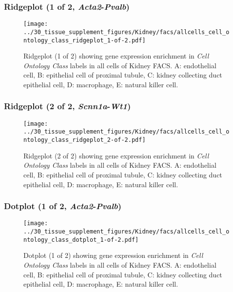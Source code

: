 \subsubsection{Ridgeplot (1 of 2, \emph{Acta2}-\emph{Pvalb})}
\begin{figure}[h]
\centering
\texttt{[image: ../30\_tissue\_supplement\_figures/Kidney/facs/allcells\_cell\_ontology\_class\_ridgeplot\_1-of-2.pdf]}

\caption{ Ridgeplot (1 of 2)  showing gene expression enrichment in \emph{Cell Ontology Class} labels in all cells of Kidney FACS. A: endothelial cell, B: epithelial cell of proximal tubule, C: kidney collecting duct epithelial cell, D: macrophage, E: natural killer cell.}
\end{figure}


\clearpage

\subsubsection{Ridgeplot (2 of 2, \emph{Scnn1a}-\emph{Wt1})}
\begin{figure}[h]
\centering
\texttt{[image: ../30\_tissue\_supplement\_figures/Kidney/facs/allcells\_cell\_ontology\_class\_ridgeplot\_2-of-2.pdf]}

\caption{ Ridgeplot (2 of 2)  showing gene expression enrichment in \emph{Cell Ontology Class} labels in all cells of Kidney FACS. A: endothelial cell, B: epithelial cell of proximal tubule, C: kidney collecting duct epithelial cell, D: macrophage, E: natural killer cell.}
\end{figure}


\clearpage

\subsubsection{Dotplot (1 of 2, \emph{Acta2}-\emph{Pvalb})}
\begin{figure}[h]
\centering
\texttt{[image: ../30\_tissue\_supplement\_figures/Kidney/facs/allcells\_cell\_ontology\_class\_dotplot\_1-of-2.pdf]}

\caption{ Dotplot (1 of 2)  showing gene expression enrichment in \emph{Cell Ontology Class} labels in all cells of Kidney FACS. A: endothelial cell, B: epithelial cell of proximal tubule, C: kidney collecting duct epithelial cell, D: macrophage, E: natural killer cell.}
\end{figure}


